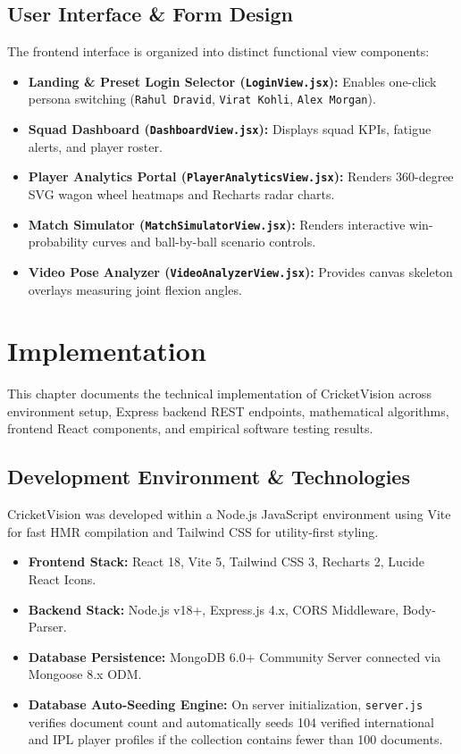 \documentclass[12pt,a4paper]{report}
\begin{document}
\section{User Interface \& Form Design}
The frontend interface is organized into distinct functional view components:
\begin{itemize}
    \item \textbf{Landing \& Preset Login Selector (\texttt{LoginView.jsx}):} Enables one-click persona switching (\texttt{Rahul Dravid}, \texttt{Virat Kohli}, \texttt{Alex Morgan}).
    \item \textbf{Squad Dashboard (\texttt{DashboardView.jsx}):} Displays squad KPIs, fatigue alerts, and player roster.
    \item \textbf{Player Analytics Portal (\texttt{PlayerAnalyticsView.jsx}):} Renders 360-degree SVG wagon wheel heatmaps and Recharts radar charts.
    \item \textbf{Match Simulator (\texttt{MatchSimulatorView.jsx}):} Renders interactive win-probability curves and ball-by-ball scenario controls.
    \item \textbf{Video Pose Analyzer (\texttt{VideoAnalyzerView.jsx}):} Provides canvas skeleton overlays measuring joint flexion angles.
\end{itemize}

\clearpage

\chapter{Implementation}

This chapter documents the technical implementation of CricketVision across environment setup, Express backend REST endpoints, mathematical algorithms, frontend React components, and empirical software testing results.

\section{Development Environment \& Technologies}
CricketVision was developed within a Node.js JavaScript environment using Vite for fast HMR compilation and Tailwind CSS for utility-first styling.

\begin{itemize}
    \item \textbf{Frontend Stack:} React 18, Vite 5, Tailwind CSS 3, Recharts 2, Lucide React Icons.
    \item \textbf{Backend Stack:} Node.js v18+, Express.js 4.x, CORS Middleware, Body-Parser.
    \item \textbf{Database Persistence:} MongoDB 6.0+ Community Server connected via Mongoose 8.x ODM.
    \item \textbf{Database Auto-Seeding Engine:} On server initialization, \texttt{server.js} verifies document count and automatically seeds 104 verified international and IPL player profiles if the collection contains fewer than 100 documents.
\end{itemize}
\end{document}
